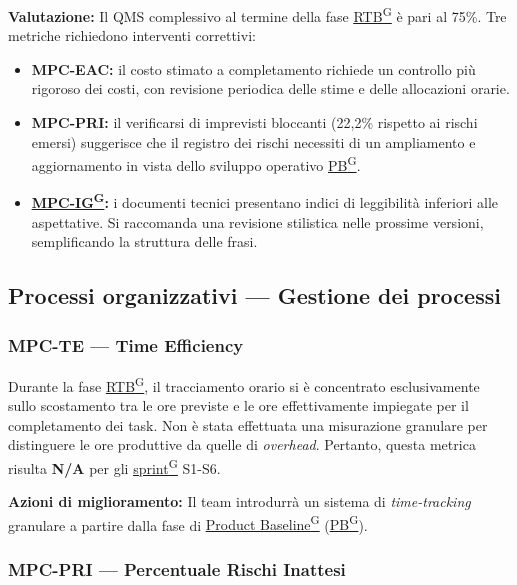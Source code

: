 \documentclass[a4paper,12pt]{article}
\providecommand{\glslink}[2]{\href{https://alittlebyte-19.github.io/Documentazione/glossario.html\#gls-#1}{\underline{#2}\textsuperscript{\scriptsize G}}}
\begin{document}
\noindent\textbf{Valutazione:} Il QMS complessivo al termine della fase \glslink{rtb-requirements-and-technology-baseline}{RTB} è pari al 75\%. Tre metriche richiedono interventi correttivi:
\begin{itemize}
    \item \textbf{MPC-EAC:} il costo stimato a completamento richiede un controllo più rigoroso dei costi, con revisione periodica delle stime e delle allocazioni orarie.
    \item \textbf{MPC-PRI:} il verificarsi di imprevisti bloccanti (22,2\% rispetto ai rischi emersi) suggerisce che il registro dei rischi necessiti di un ampliamento e aggiornamento in vista dello sviluppo operativo \glslink{pb-product-baseline}{PB}.
    \item \textbf{\glslink{indice-di-gulpease-mpc-ig}{MPC-IG}:} i documenti tecnici presentano indici di leggibilità inferiori alle aspettative. Si raccomanda una revisione stilistica nelle prossime versioni, semplificando la struttura delle frasi.
\end{itemize}

\subsection{Processi organizzativi — Gestione dei processi}

\subsubsection{MPC-TE — Time Efficiency}

Durante la fase \glslink{rtb-requirements-and-technology-baseline}{RTB}, il tracciamento orario si è concentrato esclusivamente sullo scostamento tra le ore previste e le ore effettivamente impiegate per il completamento dei task. Non è stata effettuata una misurazione granulare per distinguere le ore produttive da quelle di \textit{overhead}. Pertanto, questa metrica risulta \textbf{N/A} per gli \glslink{sprint}{sprint} S1-S6.

\noindent\textbf{Azioni di miglioramento:} Il team introdurrà un sistema di \textit{time-tracking} granulare a partire dalla fase di \glslink{pb-product-baseline}{Product Baseline} (\glslink{pb-product-baseline}{PB}).

\subsubsection{MPC-PRI — Percentuale Rischi Inattesi}
\end{document}
